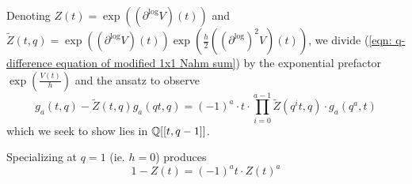 Denoting $Z(t)=\exp((\partial^{\log}V)(t))$ and $\widetilde{Z}(t,q)=\exp\left((\partial^{\log}V)(t)\right)\exp\left(\frac{h}{2}((\partial^{\log})^{2}V)(t)\right)$, we divide (\ref{eqn: q-difference equation of modified 1x1 Nahm sum}) by the exponential prefactor $\exp\left(\frac{V(t)}{h}\right)$ and the ansatz  to observe 
$$g_{a}(t,q)-\widetilde{Z}(t,q)g_{a}(qt,q)=(-1)^{a}\cdot t\cdot\prod_{i=0}^{a-1}\widetilde{Z}(q^{i}t,q)\cdot g_{a}(q^{a},t)$$
which we seek to show lies in $\mathbb{Q}[[t,q-1]]$.

Specializing at $q=1$ (ie. $h=0$) produces 
\begin{equation}\label{eqn: specialized Z functional equation}
    1-Z(t)=(-1)^{a}t\cdot Z(t)^{a}
\end{equation}

